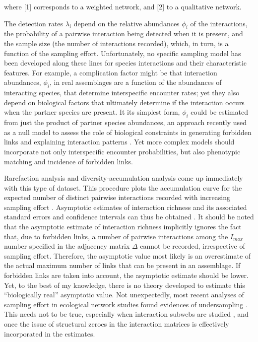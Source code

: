 \documentclass[12pt]{article}
\begin{document}
where [1] corresponds to a weighted network, and [2] to a qualitative network.

The detection rates $\lambda_i$ depend on the relative abundances $\phi_i$ of the interactions, the probability of a pairwise interaction being detected when it is present, and the sample size (the number of interactions recorded), which, in turn, is a function of the sampling effort. Unfortunately, no specific sampling model has been developed along these lines for species interactions and their characteristic features. For example, a complication factor might be that interaction abundances, $\phi_i$, in real assemblages are a function of the abundances of interacting species, that determine interspecific encounter rates; yet they also depend on biological factors that ultimately determine if the interaction occurs when the partner species are present. It its simplest form, $\phi_i$ could be estimated from just the product of partner species abundances, an approach recently used as a null model to assess the role of biological constraints in generating forbidden links and explaining interaction patterns \citep{Vizentin-Bugoni:2014hc}. Yet more complex models should incorporate not only interspecific encounter probabilities, but also phenotypic matching and incidence of forbidden links.

Rarefaction analysis and diversity-accumulation analysis \citep{Magurran:1988mm,Hortal:2006dc} come up immediately with this type of dataset. This procedure plots the accumulation curve for the expected number of distinct pairwise interactions recorded with increasing sampling effort \citep{Jordano:2009c,Olesen:2011a}. Asymptotic estimates of interaction richness and its associated standard errors and confidence intervals can thus be obtained \citep{Hortal:2006dc}. It should be noted that the asymptotic estimate of interaction richness implicitly ignores the fact that, due to forbidden links, a number of pairwise interactions among the $I_{max}$ number specified in the adjacency matrix $\Delta$ cannot be recorded, irrespective of sampling effort. Therefore, the asymptotic value most likely is an overestimate of the actual maximum number of links that can be present in an assemblage. If forbidden links are taken into account, the asymptotic estimate should be lower. Yet, to the best of my knowledge, there is no theory developed to estimate this ``biologically real'' asymptotic value. Not unexpectedly, most recent analyses of sampling effort in ecological network studies found evidences of undersampling \citep{Chacoff:2012}. This needs not to be true, especially when interaction subwebs are studied \citep{Olesen:2011a,Vizentin-Bugoni:2014hc}, and once the issue of structural zeroes in the interaction matrices is effectively incorporated in the estimates. 
\end{document}
